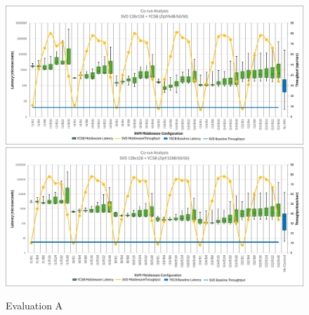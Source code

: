 

%
\label{appendix:b}


\begin{figure}[ht]
  \centering
  \includegraphics[width=\textwidth,height=\textheight,keepaspectratio,angle=0]{images/64b_50_50_middleware_eval.png}
  \includegraphics[width=\textwidth,height=\textheight,keepaspectratio,angle=0]{images/128b_50_50_middleware_eval.png}
  \caption{Evaluation A}
  \label{fig:50_50_middleware_eval}
\end{figure}

